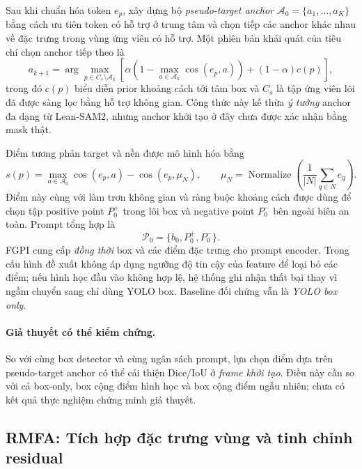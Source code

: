 Sau khi chuẩn hóa token $e_p$, xây dựng bộ
\emph{pseudo-target anchor} $\mathcal{A}_0=\{a_1,\ldots,a_K\}$
bằng cách ưu tiên token có hỗ trợ ở trung tâm và chọn tiếp các
anchor khác nhau về đặc trưng trong vùng ứng viên có hỗ trợ.
Một phiên bản khái quát của tiêu chí chọn anchor tiếp theo là
\begin{equation}
a_{k+1}
=
\arg\max_{p\in C_s\setminus\mathcal{A}_k}
\left[
\alpha\left(1-\max_{a\in\mathcal{A}_k}
\cos(e_p,a)\right)+(1-\alpha)c(p)
\right],
\label{eq:adeseg-anchor-diversity}
\end{equation}
trong đó $c(p)$ biểu diễn prior khoảng cách tới tâm box và $C_s$
là tập ứng viên lõi đã được sàng lọc bằng hỗ trợ không gian.
Công thức này kế thừa \emph{ý tưởng} anchor đa dạng từ Lean-SAM2,
nhưng anchor khởi tạo ở đây chưa được xác nhận bằng mask thật.

Điểm tương phản target và nền được mô hình hóa bằng
\begin{equation}
s(p)=\max_{a\in\mathcal{A}_0}\cos(e_p,a)
-\cos(e_p,\mu_{N}),
\qquad
\mu_{N}=\operatorname{Normalize}
\left(\frac{1}{|N|}\sum_{q\in N}e_q\right).
\label{eq:adeseg-fgpi-score}
\end{equation}
Điểm này cùng với làm trơn không gian và ràng buộc khoảng cách
được dùng để chọn tập positive point $P_0^+$ trong lõi box và
negative point $P_0^-$ bên ngoài biên an toàn. Prompt tổng hợp là
\begin{equation}
\mathcal{P}_0=\{b_0,P_0^+,P_0^-\}.
\label{eq:adeseg-joint-prompt}
\end{equation}
FGPI cung cấp \emph{đồng thời} box và các điểm đặc trưng cho
prompt encoder. Trong cấu hình đề xuất không áp dụng ngưỡng độ
tin cậy của feature để loại bỏ các điểm; nếu hình học đầu vào
không hợp lệ, hệ thống ghi nhận thất bại thay vì ngầm chuyển sang
chỉ dùng YOLO box. Baseline đối chứng vẫn là \emph{YOLO box only}.

\paragraph{Giả thuyết có thể kiểm chứng.}
So với cùng box detector và cùng ngân sách prompt, lựa chọn điểm
dựa trên pseudo-target anchor có thể cải thiện Dice/IoU ở
\emph{frame khởi tạo}. Điều này cần so với cả box-only,
box cộng điểm hình học và box cộng điểm ngẫu nhiên; chưa có
kết quả thực nghiệm chứng minh giả thuyết.

\subsection{RMFA: Tích hợp đặc trưng vùng và tinh chỉnh residual}
\label{subsec:adeseg-rmfa}

